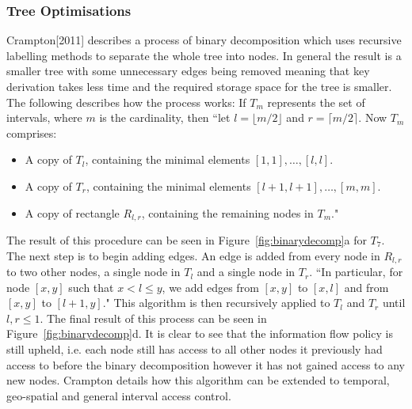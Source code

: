 \documentclass[12pt, titlepage]{article}
\begin{document}
\subsubsection{Tree Optimisations}
Crampton[2011]\cite{mainPaper} describes a process of binary decomposition which uses recursive labelling methods to separate the whole tree into nodes. In general the result is a smaller tree with some unnecessary edges being removed meaning that key derivation takes less time and the required storage space for the tree is smaller. The following describes how the process works:
\newline \indent If $T_{m}$ represents the set of intervals, where $m$ is the cardinality, then ``let $l = \lfloor m/2 \rfloor$ and $r = \lceil m/2 \rceil$. Now $T_{m}$ comprises:
\begin{itemize}
\item A copy of $T_{l}$, containing the minimal elements $[1, 1], \dots , [l,l]$.
\item A copy of $T_{r}$, containing the minimal elements $[l + 1, l + 1], \dots , [m, m]$.
\item A copy of rectangle $R_{l,r}$, containing the remaining nodes in $T_{m}$."
\end{itemize}
The result of this procedure can be seen in Figure~\ref{fig:binarydecomp}a for $T_{7}$.
\newline The next step is to begin adding edges. An edge is added from every node in $R_{l,r}$ to two other nodes, a single node in $T_{l}$ and a single node in $T_{r}$. ``In particular, for node $[x, y]$ such that $x<l≤y$, we add edges from $[x, y]$ to $[x, l]$ and from $[x, y]$ to $[l + 1, y]$."
\newline This algorithm is then recursively applied to $T_{l}$ and $T_{r}$ until $l, r ≤ 1$. The final result of this process can be seen in Figure~\ref{fig:binarydecomp}d.
\newline \indent It is clear to see that the information flow policy is still upheld, i.e. each node still has access to all other nodes it previously had access to before the binary decomposition however it has not gained access to any new nodes.
\newline \indent Crampton details how this algorithm can be extended to temporal, geo-spatial and general interval access control.
\end{document}
